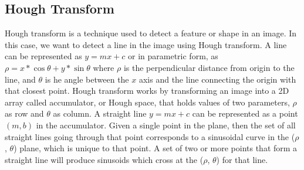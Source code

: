 \documentclass{article}
\begin{document}
    \subsection{Hough Transform}
         Hough transform is a technique used to detect a feature or shape in an image. In this case, we want to detect a line in the image using Hough transform. A line can be represented as $y = mx+c$ or in parametric form, as $\rho = x * \cos\theta + y * \sin\theta$ where $\rho$ is the perpendicular distance from origin to the line, and $\theta$ is he angle between the $x$ axis and the line connecting the origin with that closest point.  Hough transform works by transforming an image into a 2D array called accumulator, or Hough space, that holds values of two parameters, $\rho$ as row and $\theta$ as column. A straight line $y = mx+c$ can be represented as a point $(m, b)$ in the accumulator. Given a single point in the plane, then the set of all straight lines going through that point corresponds to a sinusoidal curve in the ($\rho$, $\theta$) plane, which is unique to that point. A set of two or more points that form a straight line will produce sinusoids which cross at the ($\rho$, $\theta$) for that line. 
         
\end{document}
